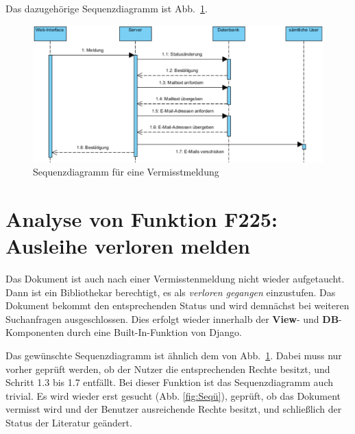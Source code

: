 Das dazugehörige Sequenzdiagramm ist Abb.\ \ref{fig:224}.
\begin{figure}
\begin{center}
\includegraphics[width=0.8\linewidth]{bilder/Seq-Vermisst.pdf}
\caption{Sequenzdiagramm für eine Vermisstmeldung}
\label{fig:224}
\end{center}
\end{figure}

\section{Analyse von Funktion F225: Ausleihe verloren melden}
\label{f:225}
Das Dokument ist auch nach einer Vermisstenmeldung nicht wieder aufgetaucht. Dann ist ein Bibliothekar berechtigt, es als \emph{verloren gegangen} einzustufen. Das Dokument bekommt den entsprechenden Status und wird demnächst bei weiteren Suchanfragen ausgeschlossen. Dies erfolgt wieder innerhalb der \textbf{View}- und \textbf{DB}-Komponenten durch eine Built-In-Funktion von Django.


Das gewünschte Sequenzdiagramm ist ähnlich dem von Abb.\ \ref{fig:224}. Dabei muss nur vorher geprüft werden, ob der Nutzer die entsprechenden Rechte besitzt, und Schritt 1.3 bis 1.7 entfällt.
Bei dieser Funktion ist das Sequenzdiagramm auch trivial. Es wird wieder erst gesucht (Abb. \ref{fig:Seqü}), geprüft, ob das Dokument vermisst wird und der Benutzer ausreichende Rechte besitzt, und schließlich der Status der Literatur geändert. 

